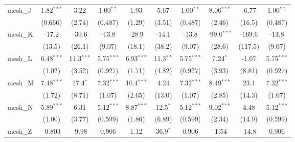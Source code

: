 \begin{tabular}{lccccccccc}
   mesh\_J                                                     & 1.82$^{***}$   & 3.22           & 1.00$^{**}$   & 1.93           & 5.67           & 1.00$^{**}$   & 8.06$^{***}$  & -6.77         & 1.00$^{**}$\\   
                                                               & (0.666)        & (2.74)         & (0.487)       & (1.29)         & (3.51)         & (0.487)       & (2.46)        & (16.5)        & (0.487)\\   
   mesh\_K                                                     & -17.2          & -39.6          & -13.8         & -28.9          & -14.1          & -13.8         & -99.0$^{***}$ & -169.6        & -13.8\\   
                                                               & (13.5)         & (26.1)         & (9.07)        & (18.1)         & (38.2)         & (9.07)        & (28.6)        & (117.5)       & (9.07)\\   
   mesh\_L                                                     & 6.48$^{***}$   & 11.3$^{***}$   & 5.75$^{***}$  & 6.93$^{***}$   & 11.3$^{**}$    & 5.75$^{***}$  & 7.24$^{*}$    & -1.07         & 5.75$^{***}$\\   
                                                               & (1.02)         & (3.52)         & (0.927)       & (1.71)         & (4.82)         & (0.927)       & (3.93)        & (8.81)        & (0.927)\\   
   mesh\_M                                                     & 7.48$^{***}$   & 17.4$^{*}$     & 7.32$^{***}$  & 10.4$^{***}$   & 4.24           & 7.32$^{***}$  & 8.49$^{***}$  & 23.1          & 7.32$^{***}$\\   
                                                               & (1.72)         & (8.71)         & (1.07)        & (2.65)         & (13.0)         & (1.07)        & (2.85)        & (14.3)        & (1.07)\\   
   mesh\_N                                                     & 5.89$^{***}$   & 6.31           & 5.12$^{***}$  & 8.87$^{***}$   & 12.5$^{*}$     & 5.12$^{***}$  & 9.02$^{***}$  & 4.48          & 5.12$^{***}$\\   
                                                               & (1.00)         & (3.77)         & (0.599)       & (1.86)         & (6.89)         & (0.599)       & (2.34)        & (14.9)        & (0.599)\\   
   mesh\_Z                                                     & -0.803         & -9.98          & 0.906         & 1.12           & 36.9$^{*}$     & 0.906         & -1.54         & -14.8         & 0.906\\   

\end{tabular}

